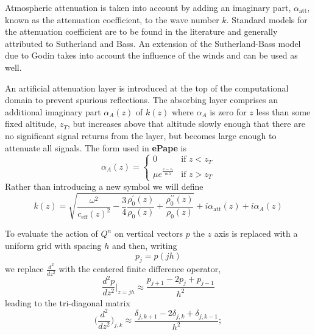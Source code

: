 Atmospheric attenuation is taken into account by adding an imaginary part, $\alpha_{\text{att}}$, known as the attenuation coefficient, to the wave number $k$. Standard models for the attenuation coefficient are to be found in the literature and generally attributed to Sutherland and Bass\cite{bass_suth}. An extension of the Sutherland-Bass model due to Godin takes into account the influence of the winds and can be used as well\cite{Godin_attenuation}. 

An artificial attenuation layer is introduced at the top of the computational domain to prevent spurious reflections. The absorbing layer comprises an additional imaginary part $\alpha_A(z)$ of $k(z)$ where $\alpha_A$ is zero for $z$ less than some fixed altitude, $z_T$, but increases above that altitude slowly enough that there are no significant signal returns from the layer, but becomes large enough to attenuate all signals. The form used in {\bf ePape} is 
\[
\alpha_A(z)=\begin{cases}
0 & \text{if } z<z_T\\
\mu e^{\frac{z-z_t}{m\lambda}} & \text{if } z>z_T
\end{cases}
\]
Rather than introducing a new symbol we will define  
\begin{equation}\label{eq:complex_k}
k(z)
=
\sqrt{\frac{\omega^2}{c_{\text{eff}}(z)^2}-\frac{3}{4}\frac{\rho_0^\prime(z)}{\rho_0(z)}+\frac{\rho_0^{\prime\prime}(z)}{\rho_0(z)}}
+i\alpha_{\text{att}}(z)+i\alpha_A(z)
\end{equation}

To evaluate the action of $Q^n$ on vertical vectors $p$ the $z$ axis is replaced with a uniform grid with spacing $h$ and then, writing
\[
p_j=p(jh)
\] 
we replace $\frac{d^2}{dz^2}$ with the centered finite difference operator, 
\[
\frac{d^2p}{dz^2}\big|_{z=jh}\approx \frac{p_{j+1}-2p_j+p_{j-1}}{h^2}
\]
leading to the tri-diagonal matrix
\[
\Big(\frac{d^2}{dz^2}\Big)_{j,k}\approx \frac{\delta_{j,k+1}-2\delta_{j,k}+\delta_{j,k-1}}{h^2};
\]

